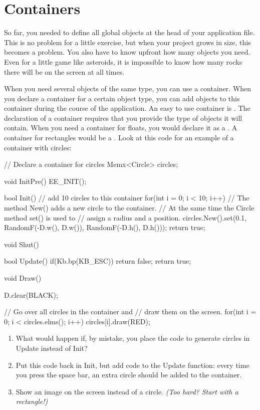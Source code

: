 \chapter{Containers}

So far, you needed to define all global objects at the head of your application file. This is no problem for a little exercise, but when your project grows in size, this becomes a problem. You also have to know upfront how many objects you need. Even for a little game like asteroids, it is impossible to know how many rocks there will be on the screen at all times.

When you need several objects of the same type, you can use a container. When you declare a container for a certain object type, you can add objects to this container during the course of the application. An easy to use container is . The declaration of a container requires that you provide the type of objects it will contain. When you need a container for floats, you would declare it as a . A container for rectangles would be a . Look at this code for an example of a container with circles:

\begin{code}
// Declare a container for circles
Memx<Circle> circles;

void InitPre()
{
   EE_INIT();
}

bool Init()
{
    // add 10 circles to this container  
	for(int i = 0; i < 10; i++)
    {
	    // The method New() adds a new circle to the container. 
	    // At the same time the Circle method set() is used to 
	    // assign a radius and a position.
        circles.New().set(0.1, RandomF(-D.w(), D.w()), RandomF(-D.h(), D.h()));
   }
   return true;
}

void Shut() {}

bool Update()
{
   if(Kb.bp(KB_ESC)) return false;  
   return true;
}

void Draw()
{
   D.clear(BLACK);
   
   // Go over all circles in the container and
   // draw them on the screen.
   for(int i = 0; i < circles.elms(); i++)
   {
      circles[i].draw(RED);
   }
}
\end{code}

\begin{exercise}
\begin{enumerate}
\item What would happen if, by mistake, you place the code to generate circles in Update instead of Init?
\item Put this code back in Init, but add code to the Update function: every time you press the space bar, an extra circle should be added to the container.
\item Show an image on the screen instead of a circle. \textit{(Too hard? Start with a rectangle!)}
\end{enumerate}
\end{exercise}

